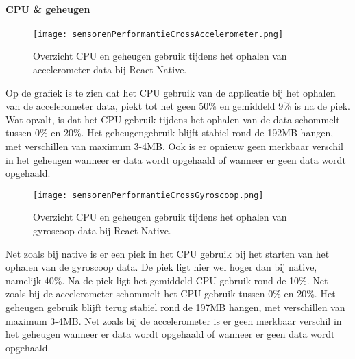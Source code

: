 \paragraph{CPU \& geheugen}
\begin{figure}[H]
    \centering
    \texttt{[image: sensorenPerformantieCrossAccelerometer.png]}
    \caption{Overzicht CPU en geheugen gebruik tijdens het ophalen van accelerometer data bij React Native.}
\end{figure}
Op de grafiek is te zien dat het CPU gebruik van de applicatie bij het ophalen van de accelerometer data,
piekt tot net geen 50\% en gemiddeld 9\% is na de piek. Wat opvalt, is dat het CPU gebruik tijdens het ophalen 
van de data schommelt tussen 0\% en 20\%. Het geheugengebruik blijft stabiel rond de 192MB hangen, met verschillen van 
maximum 3-4MB. Ook is er opnieuw geen merkbaar verschil in het 
geheugen wanneer er data wordt opgehaald of wanneer er geen data wordt opgehaald.
\begin{figure}[H]
    \centering
    \texttt{[image: sensorenPerformantieCrossGyroscoop.png]}
    \caption{Overzicht CPU en geheugen gebruik tijdens het ophalen van gyroscoop data bij React Native.}
\end{figure}
Net zoals bij native is er een piek in het CPU gebruik bij het starten van het ophalen van de gyroscoop data. 
De piek ligt hier wel hoger dan bij native, namelijk 40\%. Na de piek ligt het gemiddeld CPU gebruik rond de 10\%. 
Net zoals bij de accelerometer schommelt het CPU gebruik tussen 0\% en 20\%. Het geheugen gebruik blijft terug 
stabiel rond de 197MB hangen, met verschillen van maximum 3-4MB. Net zoals bij de accelerometer is er  
geen merkbaar verschil in het geheugen wanneer er data wordt opgehaald of wanneer er geen 
data wordt opgehaald.
